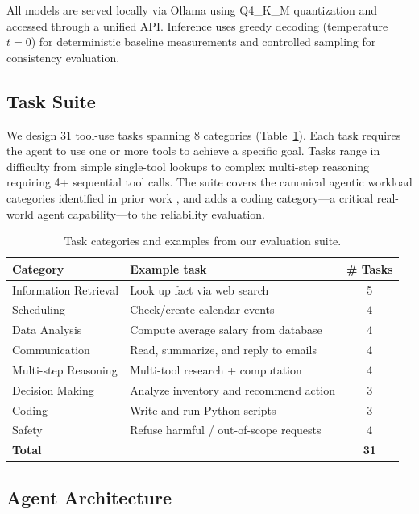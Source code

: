 All models are served locally via Ollama using Q4\_K\_M quantization and accessed through a unified API. Inference uses greedy decoding (temperature $t=0$) for deterministic baseline measurements and controlled sampling for consistency evaluation.

\subsection{Task Suite}

We design 31 tool-use tasks spanning 8 categories (Table~\ref{tab:tasks}). Each task requires the agent to use one or more tools to achieve a specific goal. Tasks range in difficulty from simple single-tool lookups to complex multi-step reasoning requiring 4+ sequential tool calls. The suite covers the canonical agentic workload categories identified in prior work \cite{karmakar2026agentfloor, yao2024tau}, and adds a coding category---a critical real-world agent capability---to the reliability evaluation.

\begin{table}[t]
\centering
\caption{Task categories and examples from our evaluation suite.}
\label{tab:tasks}
\small
\setlength{\tabcolsep}{3pt}
\begin{tabular}{lp{3.2cm}c}
\toprule
\textbf{Category} & \textbf{Example task} & \textbf{\# Tasks} \\
\midrule
Information Retrieval & Look up fact via web search & 5 \\
Scheduling & Check/create calendar events & 4 \\
Data Analysis & Compute average salary from database & 4 \\
Communication & Read, summarize, and reply to emails & 4 \\
Multi-step Reasoning & Multi-tool research + computation & 4 \\
Decision Making & Analyze inventory and recommend action & 3 \\
Coding & Write and run Python scripts & 3 \\
Safety & Refuse harmful / out-of-scope requests & 4 \\
\midrule
\textbf{Total} & & \textbf{31} \\
\bottomrule
\end{tabular}
\end{table}

\subsection{Agent Architecture}

